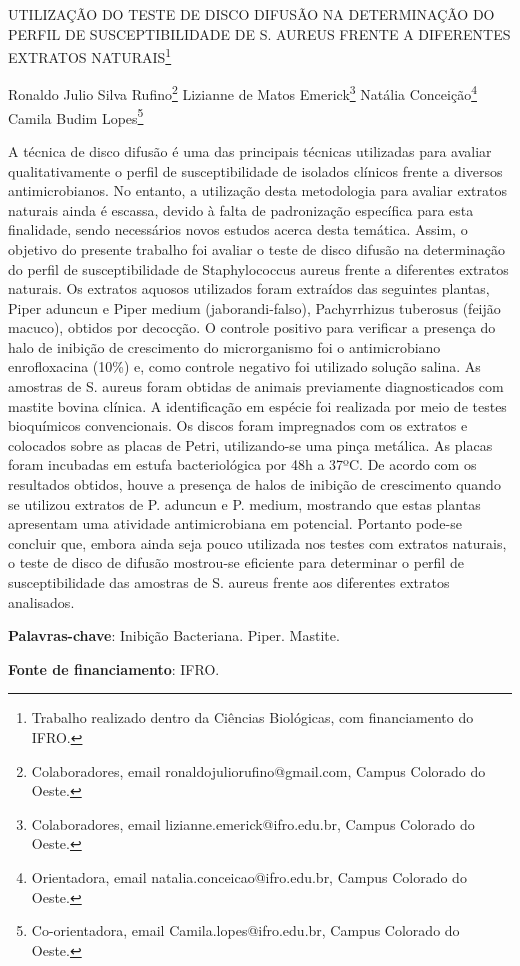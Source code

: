 \documentclass[article,12pt,onesidea,4paper,english,brazil]{abntex2}
\begin{document}
	
	
	\frenchspacing 
	
	\begin{center}
		\LARGE UTILIZAÇÃO DO TESTE DE DISCO DIFUSÃO NA DETERMINAÇÃO DO PERFIL DE SUSCEPTIBILIDADE DE S. AUREUS FRENTE A DIFERENTES EXTRATOS NATURAIS\footnote{Trabalho realizado dentro da Ciências Biológicas, com financiamento do IFRO.}
		
		\normalsize
	Ronaldo Julio Silva Rufino\footnote{Colaboradores, email ronaldojuliorufino@gmail.com, Campus Colorado do Oeste.} 
	Lizianne de Matos Emerick\footnote{Colaboradores, email lizianne.emerick@ifro.edu.br, Campus Colorado do Oeste.} 
	Natália Conceição\footnote{Orientadora, email natalia.conceicao@ifro.edu.br, Campus Colorado do Oeste.} 
	Camila Budim Lopes\footnote{Co-orientadora, email Camila.lopes@ifro.edu.br, Campus Colorado do Oeste.} 
	\end{center}
	
	\noindent A técnica de disco difusão é uma das principais técnicas utilizadas para avaliar qualitativamente o perfil de susceptibilidade de isolados clínicos frente a diversos antimicrobianos. No entanto, a utilização desta metodologia para avaliar extratos naturais ainda é escassa, devido à falta de padronização específica para esta finalidade, sendo necessários novos estudos acerca desta temática. Assim, o objetivo do presente trabalho foi avaliar o teste de disco difusão na determinação do perfil de susceptibilidade de Staphylococcus aureus frente a diferentes extratos naturais. Os extratos aquosos utilizados foram extraídos das seguintes plantas, Piper aduncun e Piper medium (jaborandi-falso), Pachyrrhizus tuberosus (feijão macuco), obtidos por decocção. O controle positivo para verificar a presença do halo de inibição de crescimento do microrganismo foi o antimicrobiano enrofloxacina (10\%) e, como controle negativo foi utilizado solução salina. As amostras de S. aureus foram obtidas de animais previamente diagnosticados com mastite bovina clínica. A identificação em espécie foi realizada por meio de testes bioquímicos convencionais. Os discos foram impregnados com os extratos e colocados sobre as placas de Petri, utilizando-se uma pinça metálica. As placas foram incubadas em estufa bacteriológica por 48h a 37ºC. De acordo com os resultados obtidos, houve a presença de halos de inibição de crescimento quando se utilizou extratos de P. aduncun e P. medium, mostrando que estas plantas apresentam uma atividade antimicrobiana em potencial. Portanto pode-se concluir que, embora ainda seja pouco utilizada nos testes com extratos naturais, o teste de disco de difusão mostrou-se eficiente para determinar o perfil de susceptibilidade das amostras de S. aureus frente aos diferentes extratos analisados. 
	\vspace{\onelineskip}
	
	\noindent
	\textbf{Palavras-chave}: Inibição Bacteriana. Piper. Mastite.
		\vspace{\onelineskip}
		
	\noindent
	\textbf{Fonte de financiamento}: IFRO.
	
\end{document}
